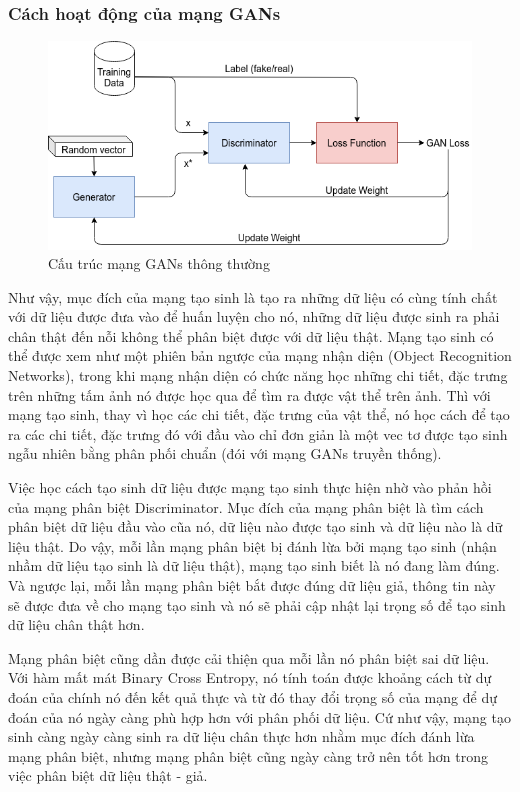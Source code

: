 \subsubsection{Cách hoạt động của mạng GANs}
\begin{figure}[H]
    \centering
    \includegraphics[width=15cm]{./content/materials/gans-pure.png}
    \caption{Cấu trúc mạng GANs thông thường}
    \label{fig:pure-gans}
\end{figure}

Như vậy, mục đích của mạng tạo sinh là tạo ra những dữ liệu có cùng tính chất với dữ liệu được đưa vào để huấn luyện cho nó, những dữ liệu được sinh ra phải chân thật đến nỗi không thể phân biệt được với dữ liệu thật. Mạng tạo sinh có thể được xem như một phiên bản ngược của mạng nhận diện (Object Recognition Networks), trong khi mạng nhận diện có chức năng học những chi tiết, đặc trưng trên những tấm ảnh nó được học qua để tìm ra được vật thể trên ảnh. Thì với mạng tạo sinh, thay vì học các chi tiết, đặc trưng của vật thể, nó học cách để tạo ra các chi tiết, đặc trưng đó với đầu vào chỉ đơn giản là một vec tơ được tạo sinh ngẫu nhiên bằng phân phối chuẩn (đói với mạng GANs truyền thống). 

Việc học cách tạo sinh dữ liệu được mạng tạo sinh thực hiện nhờ vào phản hồi của mạng phân biệt Discriminator. Mục đích của mạng phân biệt là tìm cách phân biệt dữ liệu đầu vào cũa nó, dữ liệu nào được tạo sinh và dữ liệu nào là dữ liệu thật. Do vậy, mỗi lần mạng phân biệt bị đánh lừa bởi mạng tạo sinh (nhận nhầm dữ liệu tạo sinh là dữ liệu thật), mạng tạo sinh biết là nó đang làm đúng. Và ngược lại, mỗi lần mạng phân biệt bắt được đúng dữ liệu giả, thông tin này sẽ được đưa về cho mạng tạo sinh và nó sẽ phải cập nhật lại trọng số để tạo sinh dữ liệu chân thật hơn.

Mạng phân biệt cũng dần được cải thiện qua mỗi lần nó phân biệt sai dữ liệu. Với hàm mất mát Binary Cross Entropy, nó tính toán được khoảng cách từ dự đoán của chính nó đến kết quả thực và từ đó thay đổi trọng số của mạng để dự đoán của nó ngày càng phù hợp hơn với phân phối dữ liệu. Cứ như vậy, mạng tạo sinh càng ngày càng sinh ra dữ liệu chân thực hơn nhằm mục đích đánh lừa mạng phân biệt, nhưng mạng phân biệt cũng ngày càng trở nên tốt hơn trong việc phân biệt dữ liệu thật - giả.


